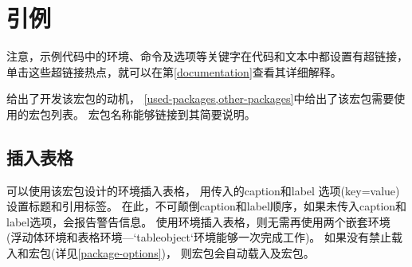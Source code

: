 
\section{引例}
\label{examples}

注意，示例代码中的环境、命令及选项等关键字在代码和文本中都设置有超链接，
单击这些超链接热点，就可以在第\cref{documentation}查看其详细解释。

给出了开发该宏包的动机，
\cref{used-packages,other-packages}中给出了该宏包需要使用的宏包列表。
宏包名称能够链接到其简要说明。


\subsection{插入表格}
\label{table}
可以使用该宏包设计的环境插入表格，
用传入的caption和label 选项(key=value)设置标题和引用标签。
在此，不可颠倒caption和label顺序，如果未传入caption和label选项，会报告警告信息。
使用环境插入表格，则无需再使用两个嵌套环境
(浮动体环境和表格环境---`tableobject`环境能够一次完成工作)。
如果没有禁止载入和宏包(详见\cref{package-options})，
则宏包会自动载入及宏包。

